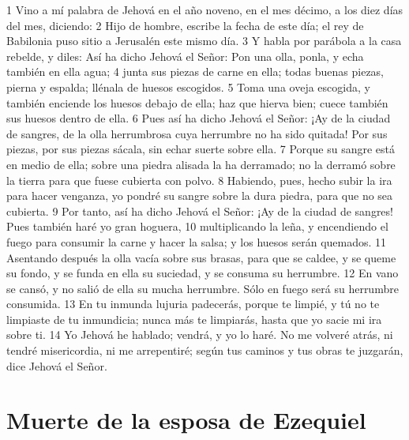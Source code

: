 1 Vino a mí palabra de Jehová en el año noveno, en el mes décimo, a los diez días del mes, diciendo:
2 Hijo de hombre, escribe la fecha de este día; el rey de Babilonia puso sitio a Jerusalén este mismo día.
3 Y habla por parábola a la casa rebelde, y diles: Así ha dicho Jehová el Señor: Pon una olla, ponla, y echa también en ella agua;
4 junta sus piezas de carne en ella; todas buenas piezas, pierna y espalda; llénala de huesos escogidos.
5 Toma una oveja escogida, y también enciende los huesos debajo de ella; haz que hierva bien; cuece también sus huesos dentro de ella.
6 Pues así ha dicho Jehová el Señor: ¡Ay de la ciudad de sangres, de la olla herrumbrosa cuya herrumbre no ha sido quitada! Por sus piezas, por sus piezas sácala, sin echar suerte sobre ella.
7 Porque su sangre está en medio de ella; sobre una piedra alisada la ha derramado; no la derramó sobre la tierra para que fuese cubierta con polvo.
8 Habiendo, pues, hecho subir la ira para hacer venganza, yo pondré su sangre sobre la dura piedra, para que no sea cubierta.
9 Por tanto, así ha dicho Jehová el Señor: ¡Ay de la ciudad de sangres! Pues también haré yo gran hoguera,
10 multiplicando la leña, y encendiendo el fuego para consumir la carne y hacer la salsa; y los huesos serán quemados.
11 Asentando después la olla vacía sobre sus brasas, para que se caldee, y se queme su fondo, y se funda en ella su suciedad, y se consuma su herrumbre.
12 En vano se cansó, y no salió de ella su mucha herrumbre. Sólo en fuego será su herrumbre consumida.
13 En tu inmunda lujuria padecerás, porque te limpié, y tú no te limpiaste de tu inmundicia; nunca más te limpiarás, hasta que yo sacie mi ira sobre ti.
14 Yo Jehová he hablado; vendrá, y yo lo haré. No me volveré atrás, ni tendré misericordia, ni me arrepentiré; según tus caminos y tus obras te juzgarán, dice Jehová el Señor.

\section*{Muerte de la esposa de Ezequiel}

